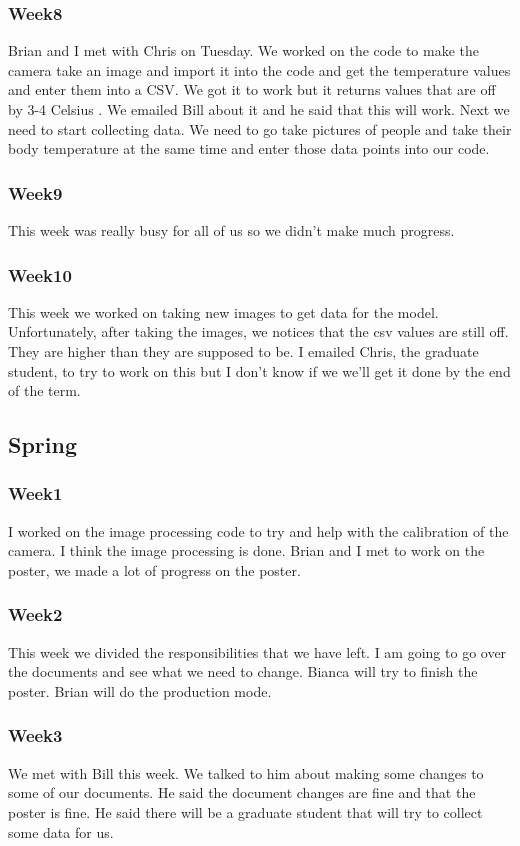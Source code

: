 \subsubsection*{Week8}
	Brian and I met with Chris on Tuesday. We worked on the code to make the camera take an image and import it into the code and get the temperature values and enter them into a CSV. We got it to work but it returns values that are off by 3-4 Celsius . We emailed Bill about it and he said that this will work. Next we need to start collecting data. We need to go take pictures of people and take their body temperature at the same time and enter those data points into our code. 
\subsubsection*{Week9}
	This week was really busy for all of us so we didn't make much progress.
\subsubsection*{Week10}
	This week we worked on taking new images to get data for the model. Unfortunately, after taking the images, we notices that the csv values are still off. They are higher than they are supposed to be. I emailed Chris, the graduate student, to try to work on this but I don't know if we we'll get it done by the end of the term. 
	
\subsection*{Spring}

\subsubsection*{Week1}
	I worked on the image processing code to try and help with the calibration of the camera. I think the image processing is done. Brian and I met to work on the poster, we made a lot of progress on the poster. 
	
\subsubsection*{Week2}
	This week we divided the responsibilities that we have left. I am going to go over the documents and see what we need to change. Bianca will try to finish the poster. Brian will do the production mode.
\subsubsection*{Week3}
	We met with Bill this week. We talked to him about making some changes to some of our documents. He said the document changes are fine and that the poster is fine. He said there will be a graduate student that will try to collect some data for us. 
